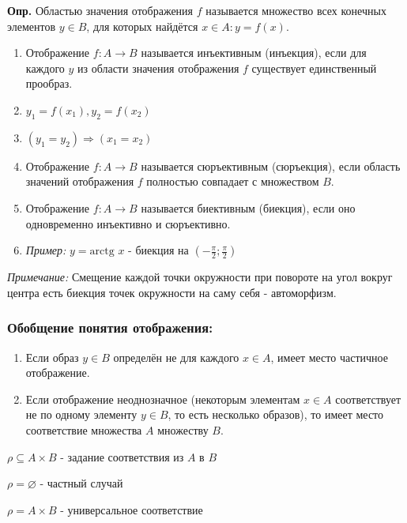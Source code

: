 \documentclass[10pt]{article}
\begin{document}
\par\textbf{Опр.} Областью значения отображения $f$ называется множество всех конечных элементов $y \in B$, для которых найдётся $x \in A: y = f(x)$.
\begin{enumerate}
    \item Отображение $f: A \rightarrow B$ называется инъективным (инъекция), если для каждого $y$ из области значения отображения $f$ существует единственный прообраз.
    \item[] $y_{1} = f(x_{1}), y_{2} = f(x_{2})$
    \item[] $(y_{1} = y_{2}) \Rightarrow (x_{1} = x_{2})$
    \item Отображение $f: A \rightarrow B$ называется сюръективным (сюръекция), если область значений отображения $f$ полностью совпадает с множеством $B$.
    \item Отображение $f: A \rightarrow B$ называется биективным (биекция), если оно одновременно инъективно и сюръективно.
    \item[] \textit{Пример:} $y = \text{arctg } x$ - биекция на $\left(-\frac{\pi}{2}; \frac{\pi}{2}\right)$
\end{enumerate}
\par\textit{Примечание:} Смещение каждой точки окружности при повороте на угол вокруг центра есть биекция точек окружности на саму себя - автоморфизм.

\subsubsection*{Обобщение понятия отображения:}
\begin{enumerate}
    \item Если образ $y \in B$ определён не для каждого $x \in A$, имеет место частичное отображение.
    \item Если отображение неоднозначное (некоторым элементам $x \in A$ соответствует не по одному элементу $y \in B$, то есть несколько образов), то имеет место соответствие множества $A$ множеству $B$.
\end{enumerate}

\par $\rho \subseteq A \times B$ - задание соответствия из $A$ в $B$
\par $\rho = \varnothing$ - частный случай
\par $\rho = A \times B$ - универсальное соответствие
\end{document}
